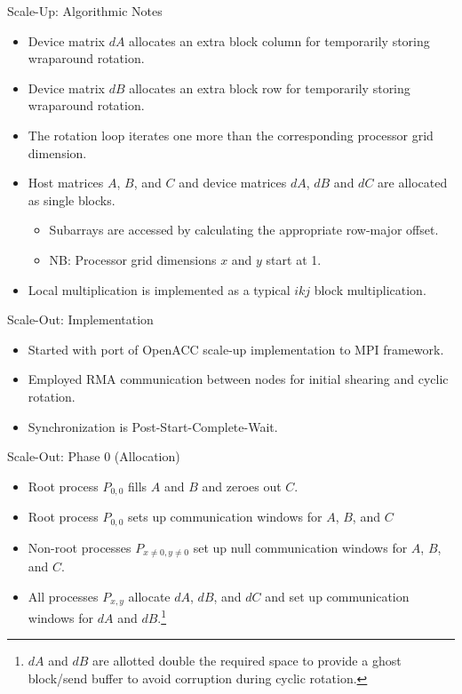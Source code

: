 \documentclass{beamer}
\begin{document}
\begin{frame}{Scale-Up: Algorithmic Notes}
  \begin{itemize}
  \item{Device matrix $dA$ allocates an extra block column for temporarily storing wraparound rotation.}
  \item{Device matrix $dB$ allocates an extra block row for temporarily storing wraparound rotation.}
  \item{The rotation loop iterates one more than the corresponding processor grid dimension.}
  \item{Host matrices $A$, $B$, and $C$ and device matrices $dA$, $dB$ and $dC$ are allocated as single blocks.}
    \begin{itemize}
    \item{Subarrays are accessed by calculating the appropriate row-major offset.}
    \item{NB: Processor grid dimensions $x$ and $y$ start at 1.}
    \end{itemize}
  \item{Local multiplication is implemented as a typical $ikj$ block multiplication.}
  \end{itemize}
\end{frame}
\begin{frame}{Scale-Out: Implementation}
  \begin{itemize}
  \item{Started with port of OpenACC scale-up implementation to MPI framework.}
  \item{Employed RMA communication between nodes for initial shearing and cyclic rotation.}
  \item{Synchronization is Post-Start-Complete-Wait.}
  \end{itemize}
\end{frame}
\begin{frame}{Scale-Out: Phase 0 (Allocation)}
  \begin{itemize}
    \item{Root process $P_{0,0}$ fills $A$ and $B$ and zeroes out $C$.}
    \item{Root process $P_{0,0}$ sets up communication windows for $A$, $B$, and $C$}
    \item{Non-root processes $P_{x\neq0,y\neq0}$ set up null communication windows for $A$, $B$, and $C$.}
    \item{All processes $P_{x,y}$ allocate $dA$, $dB$, and $dC$ and set up communication windows for $dA$ and $dB$.\footnote{$dA$ and $dB$ are allotted double the required space to provide a ghost block/send buffer to avoid corruption during cyclic rotation.}}
  \end{itemize}
\end{frame}
\end{document}
